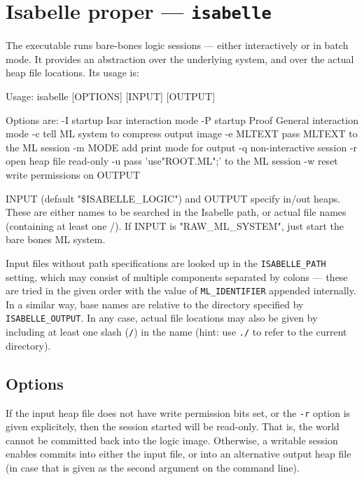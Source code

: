 \section{Isabelle proper --- \texttt{isabelle}}

The  executable runs bare-bones logic sessions --- either
interactively or in batch mode. It provides an abstraction over the underlying
{\ML} system, and over the actual heap file locations. Its usage is:
\begin{ttbox}
Usage: isabelle [OPTIONS] [INPUT] [OUTPUT]

  Options are:
    -I           startup Isar interaction mode
    -P           startup Proof General interaction mode
    -c           tell ML system to compress output image
    -e MLTEXT    pass MLTEXT to the ML session
    -m MODE      add print mode for output
    -q           non-interactive session
    -r           open heap file read-only
    -u           pass 'use"ROOT.ML";' to the ML session
    -w           reset write permissions on OUTPUT

  INPUT (default "\$ISABELLE_LOGIC") and OUTPUT specify in/out heaps.
  These are either names to be searched in the Isabelle path, or
  actual file names (containing at least one /).
  If INPUT is "RAW_ML_SYSTEM", just start the bare bones ML system.
\end{ttbox}
Input files without path specifications are looked up in the
\texttt{ISABELLE_PATH} setting, which may consist of multiple components
separated by colons --- these are tried in the given order with the value of
\texttt{ML_IDENTIFIER} appended internally.  In a similar way, base names are
relative to the directory specified by \texttt{ISABELLE_OUTPUT}.  In any case,
actual file locations may also be given by including at least one slash
(\texttt{/}) in the name (hint: use \texttt{./} to refer to the current
directory).


\subsection*{Options}

If the input heap file does not have write permission bits set, or the
\texttt{-r} option is given explicitely, then the session started will be
read-only.  That is, the {\ML} world cannot be committed back into the logic
image.  Otherwise, a writable session enables commits into either the input
file, or into an alternative output heap file (in case that is given as the
second argument on the command line).

